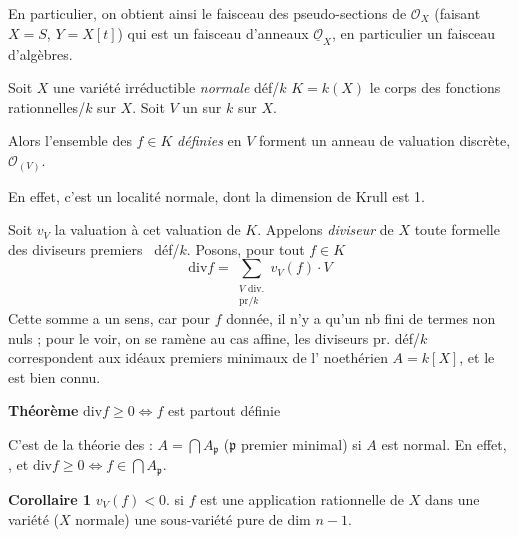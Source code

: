 \documentclass[11pt,a4paper]{article}
\begin{document}
En particulier, on obtient ainsi le faisceau des pseudo-sections de $\mathcal{O}_{X}$ (faisant $X = S$, $Y = X[t]$) qui est un faisceau d'anneaux \struck{\ill{}}  $\underline{\mathcal{O}}_{X}$, en particulier un faisceau d'algèbres.


Soit $X$ une variété irréductible \emph{normale} déf/$k$
$K = k(X)$ le corps des fonctions rationnelles/$k$ sur $X$.
Soit $V$ un   sur $k$ sur $X$.

Alors l'ensemble des $f \in K$ \emph{définies} en $V$ forment un anneau de valuation discrète, \struck{\ill{}} $\mathcal{O}_{(V)}$.

En effet, c'est un \struck{\ill{}} localité normale, dont la dimension de Krull est 1.

Soit $v_{V}$ la valuation   à cet \ill{} \ill{} \ill{} valuation de $K$. Appelons \emph{diviseur}  de $X$ toute \ill{} \ill{} formelle des diviseurs premiers \ déf/$k$. Posons, pour tout $f \in K$
\[
\mathrm{div} f = \sum_{\substack{V \text{ div.} \\ \text{pr}/k}} v_{V}(f) \cdot V
\]
Cette somme a un sens, car pour $f$ donnée, il n'y a qu'un nb fini de termes non nuls ; \struck{\ill{}} pour le voir, on se ramène au cas \struck{\ill{}} affine,  les diviseurs pr. déf/$k$ correspondent aux idéaux premiers \ill{} \ill{} minimaux de l'\ill{} \ill{}  noethérien $A = k[X]$, et le  est bien connu.

\textbf{Théorème}  $\mathrm{div} f \geqslant 0 \Longleftrightarrow f$ est partout définie

C'est  de la théorie des \ill{} \ill{}  :
$A = \bigcap A_{\mathfrak{p}}$ ($\mathfrak{p}$ premier minimal) si $A$ est normal.
En effet, \ill{} \ill{} \ill{} \ill{} \ill{} \ill{} ,
et $\mathrm{div} f \geqslant 0 \Longleftrightarrow f \in \bigcap A_{\mathfrak{p}}$.

\textbf{Corollaire 1}    $v_{V}(f) < 0$.  \ill{} \ill{} \ill{} si $f$ est une application rationnelle de $X$ dans une variété \struck{\ill{}} ($X$ normale)  \ill{} une sous-variété pure de dim $n-1$.
\end{document}

